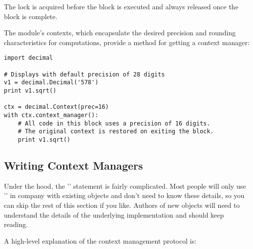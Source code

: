 \documentclass{howto}
\begin{document}
The lock is acquired before the block is executed and always released once 
the block is complete.

The  module's contexts, which encapsulate the desired
precision and rounding characteristics for computations, provide a 
 method for getting a context manager:

\begin{verbatim}
import decimal

# Displays with default precision of 28 digits
v1 = decimal.Decimal('578')
print v1.sqrt()

ctx = decimal.Context(prec=16) 
with ctx.context_manager():
    # All code in this block uses a precision of 16 digits.
    # The original context is restored on exiting the block.
    print v1.sqrt()
\end{verbatim}

\subsection{Writing Context Managers\label{context-managers}}

Under the hood, the '' statement is fairly complicated.
Most people will only use '' in company with existing
objects and don't need to know these details, so you can skip the rest
of this section if you like.  Authors of new objects will need to
understand the details of the underlying implementation and should
keep reading.

A high-level explanation of the context management protocol is:
\end{document}
